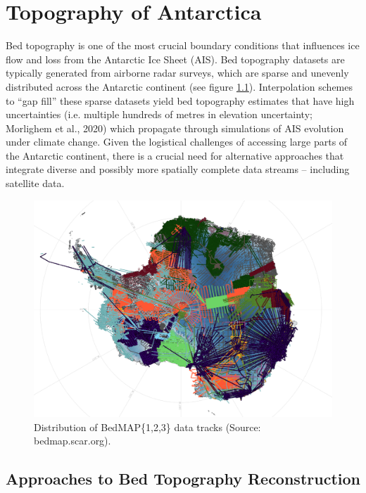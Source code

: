 \chapter{Topography of Antarctica}\label{review}

Bed topography is one of the most crucial boundary conditions that influences ice flow and loss from the Antarctic Ice Sheet (AIS)\cite{Morlighem_2020}. Bed topography datasets are typically generated from airborne radar surveys, which are sparse and unevenly distributed across the Antarctic continent (see figure \ref{fig:BedMAP}). Interpolation schemes to ``gap fill'' these sparse datasets yield bed topography estimates that have high uncertainties (i.e. multiple hundreds of metres in elevation uncertainty; Morlighem et al., 2020) which propagate through simulations of AIS evolution under climate change\cite{Castleman_2022}. Given the logistical challenges of accessing large parts of the Antarctic continent, there is a crucial need for alternative approaches that integrate diverse and possibly more spatially complete data streams – including satellite data.
\begin{figure}[H] %
    \includegraphics[scale=0.38]{bedmap.png}
    \caption{Distribution of BedMAP\{1,2,3\} data tracks (Source: bedmap.scar.org).}
    \label{fig:BedMAP}
\end{figure}

\section{Approaches to Bed Topography Reconstruction}

